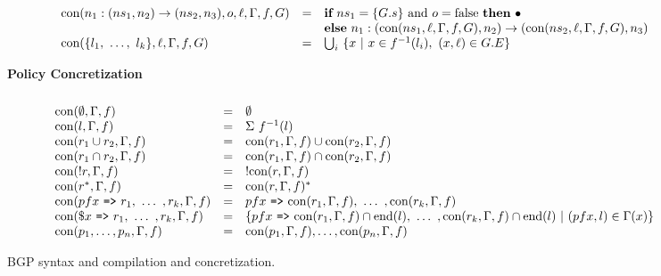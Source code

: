 \documentclass[twocolumn, openany]{sig-alternate-10pt}
\newcommand{\Path}{\texttt{=>}}
\newcommand{\hdr}[2]{\flushleft \chdr{\hspace{5mm}#1}{#2}}
\newcommand{\chdr}[2]{\textbf{#1} {#2} \\ \centering}%
\begin{document}
\begin{figure}[h!]
\begin{minipage}[t]{\linewidth}
\[\begin{array}{lcl}
     \text{con}(n_1 : ({ns}_1, n_2) \rightarrow ({ns}_2, n_3),o,\ell,\Gamma,f,G) 
        & = & \textbf{if}~ ns_1 = \{G.s\} ~\text{and}~ o = \text{false} ~\textbf{then}~ \bullet \\
        &   & \textbf{else}~ n_1 : ( \text{con}({ns}_1,\ell,\Gamma,f,G), n_2) \rightarrow (\text{con}({ns}_2,\ell,\Gamma,f,G),n_3)

        \\
     \text{con}(\{ l_1, ~\dots,~ l_k \}, \ell, \Gamma,f,G) 
        & = &  
        \bigcup_i ~ \{ x ~\vert~ x \in f^{-1}(l_i),~ (x,\ell) \in G.E \}
        \\
  \end{array} \]%
  \end{minipage}
  
  \vspace{1em}
  \vspace{1em}

  \begin{minipage}[t]{\linewidth}
  \hdr{Policy Concretization}{}
  \vspace*{-2\baselineskip}
  \[ \begin{array}{lcl}
     \\
     \Con(\emptyset, \Gamma, f)      &=& \emptyset \\
     \Con(l, \Gamma, f)              &=& \Sigma ~ f^{-1}(l) \\
     \Con(r_1 \cup r_2, \Gamma, f)   &=& \Con(r_1,\Gamma,f) \cup \Con(r_2,\Gamma,f) \\
     \Con(r_1 \cap r_2, \Gamma, f)   &=& \Con(r_1,\Gamma,f) \cap \Con(r_2,\Gamma,f) \\
     \Con(!r, \Gamma, f)             &=& !\Con(r,\Gamma,f) \\
     \Con(r^*, \Gamma, f)            &=& \Con(r,\Gamma,f)^* \\
     
     \Con(pfx ~\Path~ r_1, ~\dots~, r_k, \Gamma, f) &=& 
          pfx ~\Path~ \Con(r_1,\Gamma,f), ~\dots~, \Con(r_k,\Gamma,f)  \\

     \Con(\$x ~\Path~ r_1, ~\dots~, r_k, \Gamma, f) &=&
          
         \{ pfx ~\Path~ \Con(r_1,\Gamma,f) \cap \text{end}(l), ~\dots~,
           \Con(r_k,\Gamma,f) \cap \text{end}(l) ~\vert~ (pfx,l) \in \Gamma(x) \}  \\

     \Con(p_1, \dots, p_n, \Gamma,f) &=& \Con(p_1, \Gamma,f), \dots, \Con(p_n, \Gamma,f) \\
      
  \end{array} \]%
  \end{minipage}

  \vspace{1em}
  \hrulefill%
  \vspace{1em}

  \caption{BGP syntax and compilation and concretization.}
  \label{fig:abgp-syntax}

\end{figure}%
\end{document}
